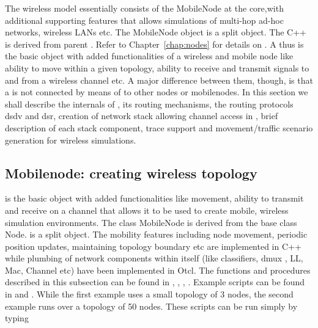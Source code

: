 The wireless model essentially consists of the MobileNode at the core,with
additional supporting features that allows simulations of multi-hop ad-hoc
networks, wireless LANs etc. The MobileNode object is a split object. The
C++  is derived from parent
. Refer to Chapter~\ref{chap:nodes} for
details on . A  thus is the basic 
object with added functionalities of a wireless and mobile node like
ability to move within a given topology, ability to receive and transmit
signals to and from a wireless channel etc. A major difference between
them, though, is that a  is not connected by means of
 to other nodes or mobilenodes. In this section we shall
describe the internals of , its routing mechanisms, the
routing protocols dsdv and dsr, creation of network stack allowing channel
access in , brief description of each stack component,
trace support and movement/traffic scenario generation for wireless
simulations. 


\subsection{Mobilenode: creating wireless topology}
\label{sec:mobilenode-creation}

 is the basic \ns {} object with added
functionalities like movement, ability to transmit and receive on a
channel that allows it to be used to create mobile, wireless simulation
environments. The class MobileNode is derived from the base class Node.
 is a split object. The mobility features including node
movement, periodic position updates, maintaining topology boundary etc are
implemented in C++ while plumbing of network components within
 itself (like classifiers, dmux , LL, Mac, Channel etc)
have been implemented in Otcl. The functions and procedures described in
this subsection can be found in ,
, ,
. Example scripts can be found in
 and . While the
first example uses a small topology of 3 nodes, the second example runs
over a topology of 50 nodes. These scripts can be run simply by typing



